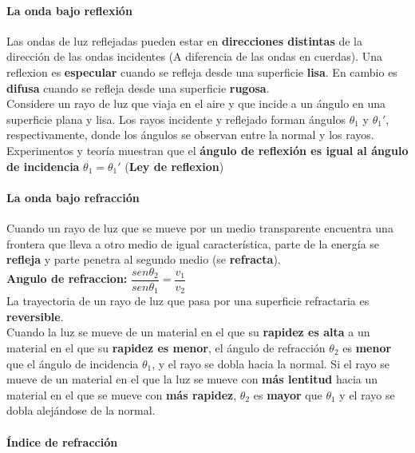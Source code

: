 \documentclass[10pt]{article}
\begin{document}
\paragraph{La onda bajo reflexión}

Las ondas de luz reflejadas pueden estar en \textbf{direcciones distintas} de la dirección de las ondas incidentes (A diferencia de las ondas en cuerdas). Una reflexion es \textbf{especular} cuando se refleja desde una superficie \textbf{lisa}. En cambio es \textbf{difusa} cuando se refleja desde una superficie \textbf{rugosa}.\\
\linebreak
Considere un rayo de luz que viaja en el aire y que incide a un ángulo en una superficie plana y lisa. Los rayos incidente y reflejado forman ángulos $\theta_1$ y $\theta_1'$, respectivamente, donde los ángulos se observan entre la normal y los rayos.  Experimentos y teoría muestran que el \textbf{ángulo de reflexión es igual al ángulo de incidencia} $\theta_1 = \theta_1'$ (\textbf{Ley de reflexion})

\paragraph{La onda bajo refracción}

Cuando un rayo de luz que se mueve por un medio transparente encuentra una frontera que lleva a otro medio de igual característica, parte de la energía se \textbf{refleja} y parte penetra al segundo medio (se \textbf{refracta}).\\
\linebreak
\textbf{Angulo de refraccion: } $\dfrac{sen \theta_2}{sen \theta_1} = \dfrac{v_1}{v_2}$\\
\linebreak
La trayectoria de un rayo de luz que pasa por una superficie refractaria es \textbf{reversible}. \\
\linebreak
Cuando la luz se mueve de un material en el que su \textbf{rapidez es alta} a un material en el que su \textbf{rapidez es menor}, el ángulo de refracción $\theta_2$ es \textbf{menor} que el ángulo de incidencia $\theta_1$, y el rayo se dobla hacia la normal. Si el rayo se mueve de un material en el que la luz se mueve con \textbf{más lentitud} hacia un material en el que se mueve con \textbf{más rapidez}, $\theta_2$ es \textbf{mayor} que $\theta_1$ y el rayo se dobla alejándose de la normal.

\paragraph{Índice de refracción}
\end{document}
